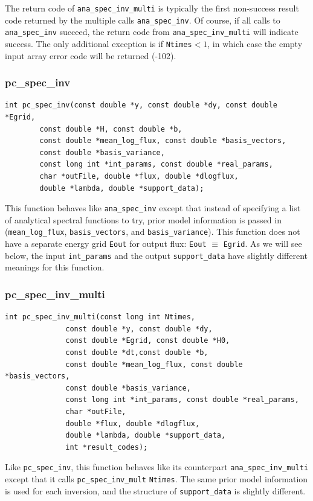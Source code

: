 \documentclass{article}    %
\begin{document}
The return code of \verb|ana_spec_inv_multi| is typically the first
non-success result code returned by the multiple calls
\verb|ana_spec_inv|. Of course, if all calls to \verb|ana_spec_inv| succeed,
the return code from \verb|ana_spec_inv_multi| will indicate
success. The only additional exception is if \verb|Ntimes|$<1$, in
which case the empty input array error code will be returned (-102).

\subsubsection{pc\_spec\_inv}
\begin{verbatim}
int pc_spec_inv(const double *y, const double *dy, const double *Egrid, 
		const double *H, const double *b,
		const double *mean_log_flux, const double *basis_vectors, 
		const double *basis_variance,
		const long int *int_params, const double *real_params,
		char *outFile, double *flux, double *dlogflux, 
		double *lambda, double *support_data);
\end{verbatim}

This function behaves like \verb|ana_spec_inv| except that instead of
specifying a list of analytical spectral functions to try, prior model
information is passed in (\verb|mean_log_flux|, \verb|basis_vectors|,
and \verb|basis_variance|). This function does not have a separate
energy grid \verb|Eout| for output flux: \verb|Eout| $\equiv$
\verb|Egrid|.  As we will see below, the input
\verb|int_params| and the output \verb|support_data| have slightly different
meanings for this function.

\subsubsection{pc\_spec\_inv\_multi}

\begin{verbatim}
int pc_spec_inv_multi(const long int Ntimes,
		      const double *y, const double *dy, 
		      const double *Egrid, const double *H0, 
		      const double *dt,const double *b,
		      const double *mean_log_flux, const double *basis_vectors, 
		      const double *basis_variance,
		      const long int *int_params, const double *real_params,
		      char *outFile, 
		      double *flux, double *dlogflux, 
		      double *lambda, double *support_data, 
		      int *result_codes);
\end{verbatim}

Like \verb|pc_spec_inv|, this function behaves like its counterpart
\verb|ana_spec_inv_multi| except that it calls \verb|pc_spec_inv_mult| \verb|Ntimes|. 
The same prior model information is used for each inversion, and the structure
of \verb|support_data| is slightly different.
\end{document}
